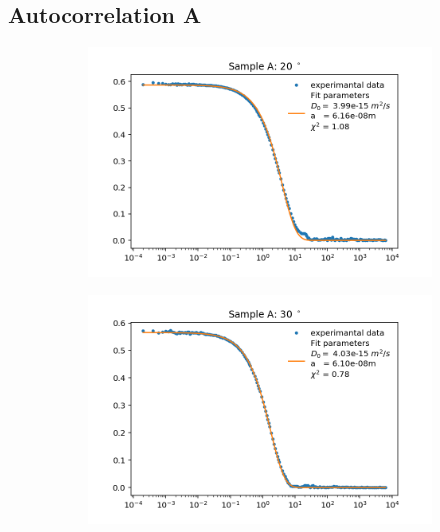 \documentclass[]{article}
\begin{document}
\subsection{Autocorrelation A}
\label{autocorr A}
\begin{figure}[!h]
\centering

\begin{subfigure}{0.48\textwidth}
\includegraphics[width=\linewidth]{Plots/A/20.png}
\end{subfigure}
\begin{subfigure}[c]{0.48\linewidth}
\includegraphics[width=\linewidth]{Plots/A/30.png}
\end{subfigure}


\end{figure}
\end{document}
